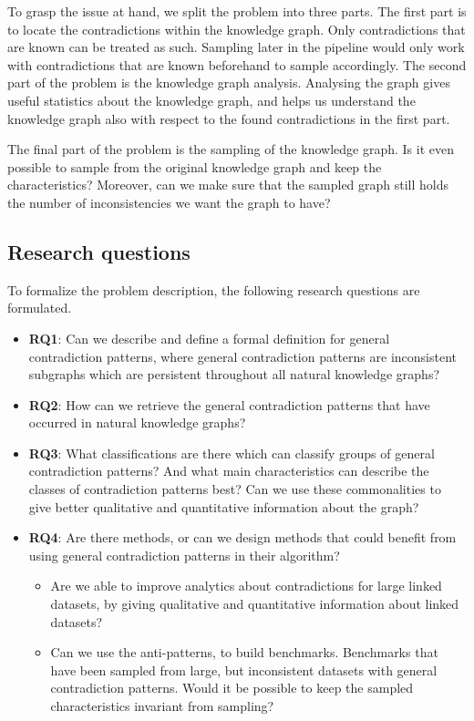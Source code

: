 \documentclass[11pt,letterpaper ,oneside ]{book}
\begin{document}
	To grasp the issue at hand, we split the problem into three parts. The first part is to locate the contradictions within the knowledge graph. Only contradictions that are known can be treated as such. Sampling later in the pipeline would only work with contradictions that are known beforehand to sample accordingly.
	The second part of the problem is the knowledge graph analysis. Analysing the graph gives useful statistics about the knowledge graph, and helps us understand the knowledge graph also with respect to the found contradictions in the first part.
	
	The final part of the problem is the sampling of the knowledge graph. Is it even possible to sample from the original knowledge graph and keep the characteristics? Moreover, can we make sure that the sampled graph still holds the number of inconsistencies we want the graph to have? 
	
	\subsection{Research questions}
	To formalize the problem description, the following research questions are formulated.
	\begin{itemize}
		\item \textbf{RQ1}: Can we describe and define a formal definition for general contradiction patterns, where general contradiction patterns are inconsistent subgraphs which are persistent throughout all natural knowledge graphs?
		\item \textbf{RQ2}: How can we retrieve the general contradiction patterns that have occurred in natural knowledge graphs? 
		\item \textbf{RQ3}: What classifications are there which can classify groups of general contradiction patterns? And what main characteristics can describe the classes of contradiction patterns best? Can we use these commonalities to give better qualitative and quantitative information about the graph?
		\item \textbf{RQ4}: Are there methods, or can we design methods that could benefit from using general contradiction patterns in their algorithm? 
		\begin{itemize}
			\item Are we able to improve analytics about contradictions for large linked datasets, by giving qualitative and quantitative information about linked datasets?
			\item Can we use the anti-patterns, to build benchmarks. Benchmarks that have been sampled from large, but inconsistent datasets with general contradiction patterns. Would it be possible to keep the sampled characteristics invariant from sampling?
		\end{itemize}
	\end{itemize}
	
\end{document}

